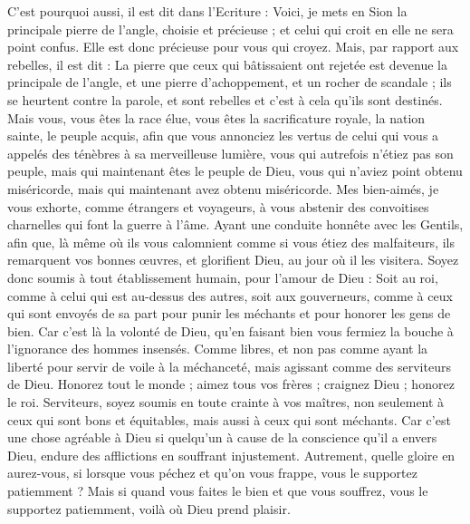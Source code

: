 \begin{multicols}{2}
C'est pourquoi aussi, il est dit dans l'Ecriture : Voici, je mets en Sion la principale pierre de l'angle, choisie et précieuse ; et celui qui croit en elle ne sera point confus.
Elle est donc précieuse pour vous qui croyez. Mais, par rapport aux rebelles, il est dit : La pierre que ceux qui bâtissaient ont rejetée est devenue la principale de l'angle, 
et une pierre d'achoppement, et un rocher de scandale ; ils se heurtent contre la parole, et sont rebelles et c'est à cela qu'ils sont destinés.
Mais vous, vous êtes la race élue, vous êtes la sacrificature royale, la nation sainte, le peuple acquis, afin que vous annonciez les vertus de celui qui vous a appelés des ténèbres à sa merveilleuse lumière,
vous qui autrefois n'étiez pas son peuple, mais qui maintenant êtes le peuple de Dieu, vous qui n'aviez point obtenu miséricorde, mais qui maintenant avez obtenu miséricorde.
Mes bien-aimés, je vous exhorte, comme étrangers et voyageurs, à vous abstenir des convoitises charnelles qui font la guerre à l'âme.
Ayant une conduite honnête avec les Gentils, afin que, là même où ils vous calomnient comme si vous étiez des malfaiteurs, ils remarquent vos bonnes œuvres, et glorifient Dieu, au jour où il les visitera.
Soyez donc soumis à tout établissement humain, pour l'amour de Dieu : Soit au roi, comme à celui qui est au-dessus des autres,
soit aux gouverneurs, comme à ceux qui sont envoyés de sa part pour punir les méchants et pour honorer les gens de bien.
Car c'est là la volonté de Dieu, qu'en faisant bien vous fermiez la bouche à l'ignorance des hommes insensés.
Comme libres, et non pas comme ayant la liberté pour servir de voile à la méchanceté, mais agissant comme des serviteurs de Dieu.
Honorez tout le monde ; aimez tous vos frères ; craignez Dieu ; honorez le roi.
Serviteurs, soyez soumis en toute crainte à vos maîtres, non seulement à ceux qui sont bons et équitables, mais aussi à ceux qui sont méchants.
Car c'est une chose agréable à Dieu si quelqu'un à cause de la conscience qu'il a envers Dieu, endure des afflictions en souffrant injustement. 
Autrement, quelle gloire en aurez-vous, si lorsque vous péchez et qu’on vous frappe, vous le supportez  patiemment ? Mais si quand vous faites le bien et que vous souffrez, vous le supportez patiemment, voilà où Dieu prend plaisir. 

\end{multicols}
